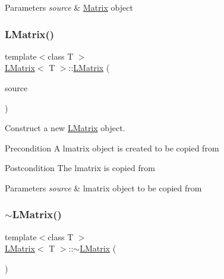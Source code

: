 \begin{DoxyParams}{Parameters}
{\em source} & \mbox{\hyperlink{class_matrix}{Matrix}} object \\
\hline
\end{DoxyParams}
\mbox{\label{class_l_matrix_a0a4d56623c6c83d9fd2c3040e41429ae}} 
\subsubsection{\texorpdfstring{LMatrix()}{LMatrix()}\hspace{0.1cm}{\footnotesize\ttfamily [4/5]}}
{\footnotesize\ttfamily template$<$class T $>$ \\
\mbox{\hyperlink{class_l_matrix}{L\+Matrix}}$<$ T $>$\+::\mbox{\hyperlink{class_l_matrix}{L\+Matrix}} (\begin{DoxyParamCaption}\item[{const \mbox{\hyperlink{class_l_matrix}{L\+Matrix}}$<$ T $>$ \&}]{source }\end{DoxyParamCaption})}



Construct a new \mbox{\hyperlink{class_l_matrix}{L\+Matrix}} object. 

\begin{DoxyPrecond}{Precondition}
A lmatrix object is created to be copied from 
\end{DoxyPrecond}
\begin{DoxyPostcond}{Postcondition}
The lmatrix is copied from
\end{DoxyPostcond}

\begin{DoxyParams}{Parameters}
{\em source} & lmatrix object to be copied from \\
\hline
\end{DoxyParams}
\mbox{\label{class_l_matrix_ab4289f015b6b154b0f396550c1975250}} 
\subsubsection{\texorpdfstring{$\sim$LMatrix()}{~LMatrix()}}
{\footnotesize\ttfamily template$<$class T $>$ \\
\mbox{\hyperlink{class_l_matrix}{L\+Matrix}}$<$ T $>$\+::$\sim$\mbox{\hyperlink{class_l_matrix}{L\+Matrix}} (\begin{DoxyParamCaption}{ }\end{DoxyParamCaption})}



